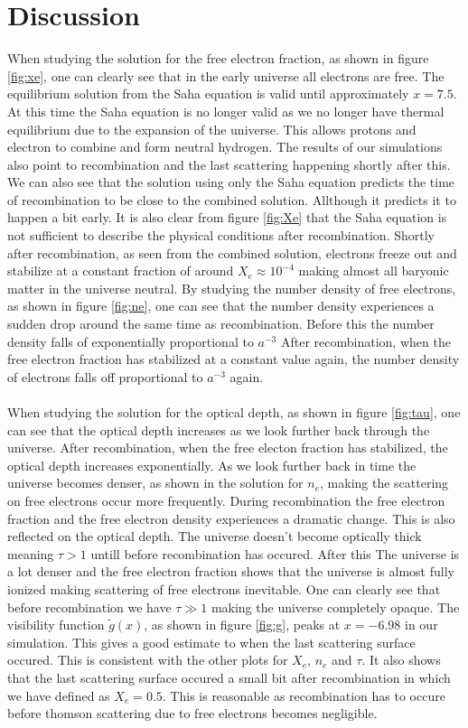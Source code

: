 \documentclass[onecolumn]{aastex62}
\begin{document}
\section{Discussion}\label{sec:discussion}
When studying the solution for the free electron fraction, as shown in figure \ref{fig:xe}, one can clearly see that in the early universe all electrons are free. The equilibrium solution from the Saha equation is valid until approximately $x=7.5$. At this time the Saha equation is no longer valid as we no longer have thermal equilibrium due to the expansion of the universe. This allows protons and electron to combine and form neutral hydrogen. The results of our simulations also point to recombination and the last scattering happening shortly after this. We can also see that the solution using only the Saha equation predicts the time of recombination to be close to the combined solution. Allthough it predicts it to happen a bit early. It is also clear from figure \ref{fig:Xe} that the Saha equation is not sufficient to describe the physical conditions after recombination. Shortly after recombination, as seen from the combined solution, electrons freeze out and stabilize at a constant fraction of around $X_e\approx10^{-4}$ making almost all baryonic matter in the universe neutral. By studying the number density of free electrons, as shown in figure \ref{fig:ne}, one can see that the number density experiences a sudden drop around the same time as recombination. Before this the number density falls of exponentially proportional to $a^{-3}$ After recombination, when the free electron fraction has stabilized at a constant value again, the number density of electrons falls off proportional to $a^{-3}$ again.\\\\\indent
When studying the solution for the optical depth, as shown in figure \ref{fig:tau}, one can see that the optical depth increases as we look further back through the universe. After recombination, when the free electon fraction has stabilized, the optical depth increases exponentially. As we look further back in time the universe becomes denser, as shown in the solution for $n_e$, making the scattering on free electrons occur more frequently. During recombination the free electron fraction and the free electron density experiences a dramatic change. This is also reflected on the optical depth. The universe doesn't become optically thick meaning $\tau>1$ untill before recombination has occured. After this The universe is a lot denser and the free electron fraction shows that the universe is almost fully ionized making scattering of free electrons inevitable. One can clearly see that before recombination we have $\tau\gg 1$ making the universe completely opaque. The visibility function $\widetilde{g}(x)$, as shown in figure \ref{fig:g}, peaks at $x=-6.98$ in our simulation. This gives a good estimate to when the last scattering surface occured. This is consistent with the other plots for $X_e$, $n_e$ and $\tau$. It also shows that the last scattering surface occured a small bit after recombination in which we have defined as $X_e=0.5$. This is reasonable as recombination has to occure before thomson scattering due to free electrons becomes negligible. \\\\\indent
\end{document}
